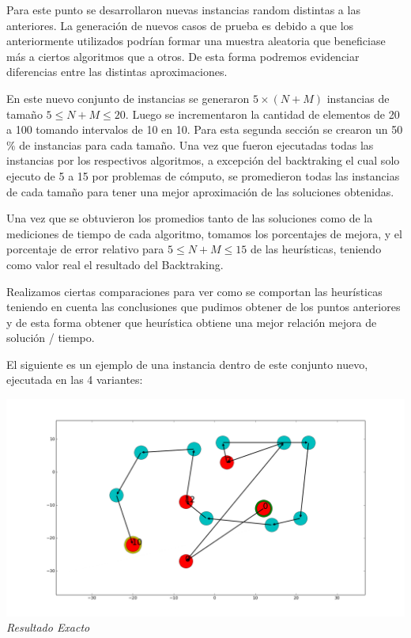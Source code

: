 Para este punto se desarrollaron nuevas instancias random distintas a las anteriores. La generación de nuevos casos de prueba es debido a que los anteriormente utilizados podrían formar una muestra aleatoria que beneficiase más a ciertos algoritmos que a otros. De esta forma podremos evidenciar diferencias entre las distintas aproximaciones.

En este nuevo conjunto de instancias se generaron $5 \times (N+M)$ instancias de tamaño $5 \leq N+M \leq 20$. Luego se incrementaron la cantidad de elementos de 20 a 100 tomando intervalos de 10 en 10. Para esta segunda secci\'on se crearon un 50$\%$ de instancias para cada tamaño.
Una vez que fueron ejecutadas todas las instancias por los respectivos algoritmos, a excepci\'on del backtraking el cual solo ejecuto de 5 a 15 por problemas de c\'omputo, se promedieron todas las instancias de cada tamaño para tener una mejor aproximaci\'on de las soluciones obtenidas. 

Una vez que se obtuvieron los promedios tanto de las soluciones como de la mediciones de tiempo de cada algoritmo, tomamos los porcentajes de mejora, y el porcentaje de error relativo para $5 \leq N+M \leq 15$ de las heurísticas, teniendo como valor real el resultado del Backtraking.

Realizamos ciertas comparaciones para ver como se comportan las heurísticas teniendo en cuenta las conclusiones que pudimos obtener de los puntos anteriores y de esta forma obtener que heurística obtiene una mejor relación mejora de solución / tiempo.

El siguiente es un ejemplo de una instancia dentro de este conjunto nuevo, ejecutada en las 4 variantes:

 
    \vspace*{0.3cm} \vspace*{0.3cm}
  \begin{center}
\includegraphics[scale=0.3]{./EJ5/caminoExacto.png}
\\{\textit{Resultado Exacto}}
  \end{center}
  \vspace*{0.3cm}

